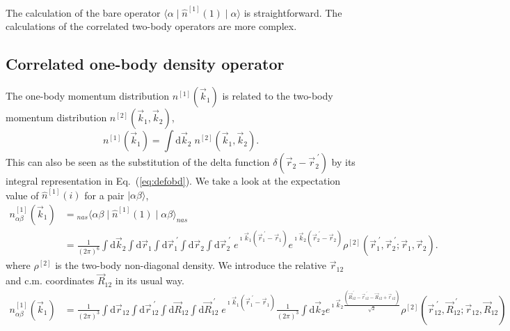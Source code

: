 \documentclass[notitlepage,a4paper,final,amsfonts,amsmath,amssymb]{revtex4-1}
\newcommand{\ket}[1]{\mid #1 \rangle}
\newcommand{\bra}[1]{\langle #1 \mid}
\begin{document}
The calculation of the bare operator $\bra{\alpha} \hat{n}^{[1]}(1) \ket{\alpha}$
is straightforward.
The calculations of the correlated two-body operators are more complex.

\subsection{Correlated one-body density operator}
The one-body momentum distribution $n^{[1]}(\vec{k}_1)$ is related to the two-body momentum distribution $n^{[2]}(\vec{k}_1,\vec{k}_2)$,
\begin{equation}
  n^{[1]}(\vec{k}_1) = \int \mathrm{d} \vec{k}_2 \; n^{[2]}(\vec{k}_1,\vec{k}_2).
\end{equation}
This can also be seen as the substitution of the delta function 
$\delta( \vec{r}_2 -\vec{r}_2^{\;\prime})$ by its integral representation 
in Eq.~(\ref{eq:defobd}).
We take a look at the expectation value of $\hat{n}^{[1]}(i)$ for a pair $\ket{\alpha\beta}$,
\begin{align}
  n^{[1]}_{\alpha\beta}(\vec{k}_1) 
  & =  {}_{nas} \bra{\alpha\beta} \hat{n}^{[1]}(1) \ket{\alpha\beta}_{nas}
  \nonumber \\ 
  & = \frac{1}{(2\pi)^6} 
  \int \mathrm{d} \vec{k}_2 
  \int \mathrm{d} \vec{r}_1 \int \mathrm{d} \vec{r}_1^{\;\prime} 
  \int \mathrm{d} \vec{r}_2 \int \mathrm{d} \vec{r}_2^{\;\prime} \;
  e^{\imath  \vec{k}_1 (\vec{r}_1^{\;\prime} - \vec{r}_1 )}
  e^{\imath  \vec{k}_2 (\vec{r}_2^{\;\prime} - \vec{r}_2 )}
  \rho^{[2]}(\vec{r}_1^{\;\prime}, \vec{r}_2^{\;\prime}; \vec{r}_1, \vec{r}_2).
\end{align}
where  $\rho^{[2]}$ is the two-body non-diagonal density.
We introduce the relative $\vec{r}_{12}$ and c.m. coordinates $\vec{R}_{12}$ in its usual way.
\begin{align}
  n^{[1]}_{\alpha\beta}(\vec{k}_1) 
  & = \frac{1}{(2\pi)^3} 
  \int \mathrm{d} \vec{r}_{12} \int \mathrm{d} \vec{r}_{12}^{\;\prime} 
  \int \mathrm{d} \vec{R}_{12} \int \mathrm{d} \vec{R}_{12}^{\;\prime} \;
  e^{\imath  \vec{k}_1 (\vec{r}_1^{\;\prime} - \vec{r}_1 )}
  \frac{1}{(2\pi)^3} \int \mathrm{d} \vec{k}_2 
  e^{\imath  \vec{k}_2 \frac{(\vec{R}_{12}^{\;\prime} - \vec{r}_{12}^{\;\prime}- \vec{R}_{12} + \vec{r}_{12} )}{\sqrt{2}}}
  \rho^{[2]}(\vec{r}_{12}^{\;\prime}, \vec{R}_{12}^{\;\prime}; \vec{r}_{12}, \vec{R}_{12}) 
  \label{eq:n10}
\end{align}
\end{document}
